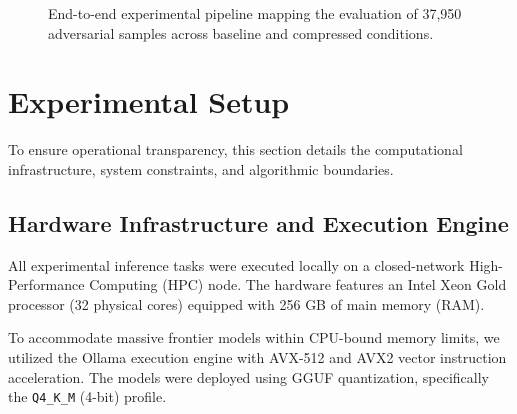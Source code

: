 \documentclass[conference]{IEEEtran}
\begin{document}
\begin{figure}[htbp]
{
}
\caption{End-to-end experimental pipeline mapping the evaluation of 37,950 adversarial samples across baseline and compressed conditions.}
\label{fig:pipeline}
\end{figure}

\section{Experimental Setup}

To ensure operational transparency, this section details the computational infrastructure, system constraints, and algorithmic boundaries.

\subsection{Hardware Infrastructure and Execution Engine}
All experimental inference tasks were executed locally on a closed-network High-Performance Computing (HPC) node. The hardware features an Intel Xeon Gold processor (32 physical cores) equipped with 256 GB of main memory (RAM). 

To accommodate massive frontier models within CPU-bound memory limits, we utilized the Ollama execution engine with AVX-512 and AVX2 vector instruction acceleration. The models were deployed using GGUF quantization, specifically the \texttt{Q4\_K\_M} (4-bit) profile.
\end{document}
